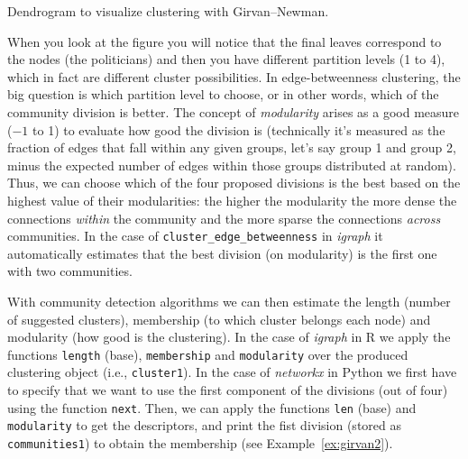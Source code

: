 \begin{ccsexample}
  \caption{Dendrogram to visualize clustering with Girvan--Newman.}
  \label{ex:girvan}
\end{ccsexample}



When you look at the figure you will notice that the final leaves correspond to the nodes (the politicians) and then you have different partition levels (1 to 4), which in fact are different cluster possibilities. In edge-betweenness clustering, the big question is which partition level to choose, or in other words, which of the community division is better. The concept of \emph{modularity} arises as a good measure ($-1$ to 1) to evaluate how good the division is (technically it's measured as the fraction of edges that fall within any given groups, let's say group 1 and group 2, minus the expected number of edges within those groups distributed at random). Thus, we can choose which of the four proposed divisions is the best based on the highest value of their modularities: the higher the modularity the more dense the connections \textit{within} the community and the more sparse the connections \textit{across} communities. In the case of \texttt{cluster\_edge\_betweenness} in \emph{igraph} it automatically estimates that the best division (on modularity) is the first one with two communities.

With community detection algorithms we can then estimate the length (number of suggested clusters), membership (to which cluster belongs each node) and modularity (how good is the clustering). In the case of \emph{igraph} in R we apply the functions \texttt{length} (base), \texttt{membership} and \texttt{modularity} over the produced clustering object (i.e., \texttt{cluster1}). In the case of \emph{networkx} in Python we first have to specify that we want to use the first component of the divisions (out of four) using the function \texttt{next}. Then, we can apply the functions \texttt{len} (base) and \texttt{modularity} to get the descriptors, and print the fist division (stored as \texttt{communities1}) to obtain the membership (see Example~\ref{ex:girvan2}).


